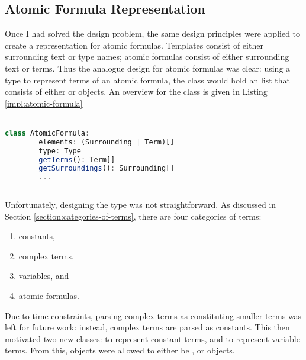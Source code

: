 \documentclass[../main.tex]{subfiles}
\begin{document}
\subsection{Atomic Formula Representation}
Once I had solved the  design problem, the same design principles were applied to create a representation for atomic formulas. Templates consist of either surrounding text or type names; atomic formulas consist of either surrounding text or terms. Thus the analogue design for atomic formulas was clear: using a type  to represent terms of an atomic formula, the  class would hold an  list that consists of either  or  objects. An overview for the  class is given in Listing \ref{impl:atomic-formula}
\\
\\
\begin{lstlisting}[language={TypeScript}, label={impl:atomic-formula}, caption={An overview of the \codeword{AtomicFormula} class.}]
    class AtomicFormula:
        elements: (Surrounding | Term)[]
        type: Type
        getTerms(): Term[]
        getSurroundings(): Surrounding[]
        ...
        
\end{lstlisting}
Unfortunately, designing the type  was not straightforward. As discussed in Section \ref{section:categories-of-terms}, there are four categories of terms:
\begin{enumerate}
    \item constants,
    \item complex terms,
    \item variables, and
    \item atomic formulas.
\end{enumerate}
Due to time constraints, parsing complex terms as constituting smaller terms was left for future work: instead, complex terms are parsed as constants. This then motivated two new classes:  to represent constant terms, and  to represent variable terms. From this,  objects were allowed to either be ,  or  objects.
\end{document}
